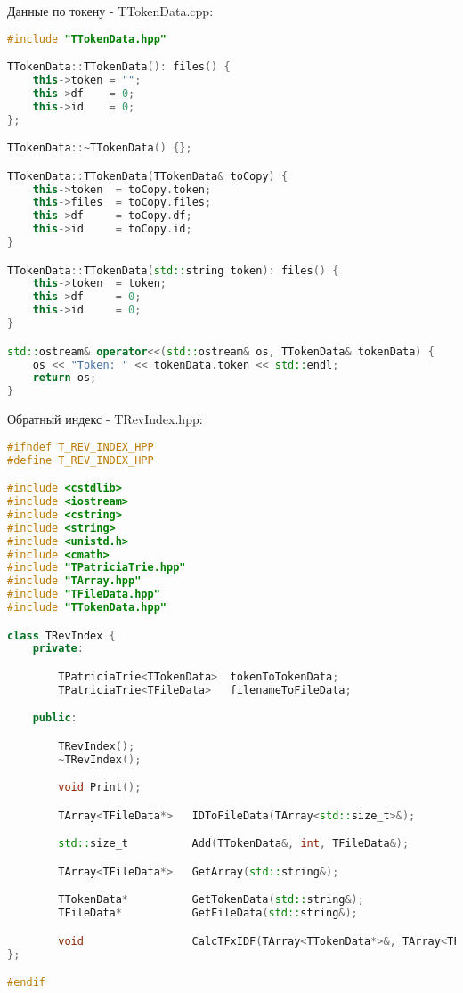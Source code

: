 Данные по токену - TTokenData.cpp:
\begin{lstlisting}[language=C++]
#include "TTokenData.hpp"

TTokenData::TTokenData(): files() {
    this->token = "";
    this->df    = 0;
    this->id    = 0;
};

TTokenData::~TTokenData() {};

TTokenData::TTokenData(TTokenData& toCopy) {
    this->token  = toCopy.token;
    this->files  = toCopy.files;
    this->df     = toCopy.df;
    this->id     = toCopy.id;
}

TTokenData::TTokenData(std::string token): files() {
    this->token  = token;
    this->df     = 0;
    this->id     = 0;
}

std::ostream& operator<<(std::ostream& os, TTokenData& tokenData) {
    os << "Token: " << tokenData.token << std::endl;
    return os;
}
\end{lstlisting}

Обратный индекс - TRevIndex.hpp:
\begin{lstlisting}[language=C++]
#ifndef T_REV_INDEX_HPP
#define T_REV_INDEX_HPP

#include <cstdlib>
#include <iostream>
#include <cstring>
#include <string>
#include <unistd.h>
#include <cmath>
#include "TPatriciaTrie.hpp"
#include "TArray.hpp"
#include "TFileData.hpp"
#include "TTokenData.hpp"

class TRevIndex {
    private:

        TPatriciaTrie<TTokenData>  tokenToTokenData;
        TPatriciaTrie<TFileData>   filenameToFileData;

    public:

        TRevIndex();
        ~TRevIndex();

        void Print();

        TArray<TFileData*>   IDToFileData(TArray<std::size_t>&);

        std::size_t          Add(TTokenData&, int, TFileData&);

        TArray<TFileData*>   GetArray(std::string&);

        TTokenData*          GetTokenData(std::string&);
        TFileData*           GetFileData(std::string&);

        void                 CalcTFxIDF(TArray<TTokenData*>&, TArray<TFileData*>&);
};

#endif
\end{lstlisting}

